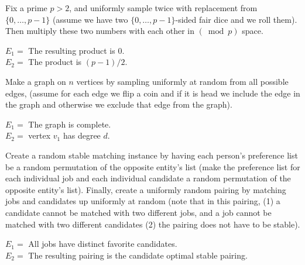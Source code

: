 \documentclass[11pt]{article}
\begin{document}
\begin{Parts}
    \Part Fix a prime $p>2$, and uniformly sample twice with replacement from
    $\{0, \dots, p-1\}$ (assume we have two $\{0, \dots, p-1\}$-sided fair dice and we roll them). Then multiply these two numbers with each other in
    $(\bmod{p})$ space.\\
    \begin{center}
    $E_1 =$ The resulting product is $0$.\\
    $E_2 =$ The product is $(p-1)/2$.
    \end{center}

    \Part Make a graph on $n$ vertices by sampling uniformly at random from all possible edges, (assume for each edge we flip a coin and if it is head we include the edge in the graph and otherwise we exclude that edge from the graph).\\
    \begin{center}
    $E_1 =$ The graph is complete.\\
    $E_2 =$ vertex $v_1$ has degree $d$.
    \end{center}

    \Part Create a random stable matching instance by having each person's
    preference list be a random permutation of the opposite entity's list (make the preference list for each individual job and each individual candidate a random permutation of the opposite entity's list). Finally, create a uniformly random pairing by matching jobs and candidates up uniformly at random (note that in this pairing, (1) a candidate cannot be matched with two different jobs, and a job cannot be matched with two different candidates (2) the pairing does not have to be stable).\\
    \begin{center}
     $E_1 =$ All jobs have distinct favorite candidates.\\
     $E_2 =$ The resulting pairing is the candidate optimal stable pairing.
    \end{center}

\end{Parts}
\end{document}
